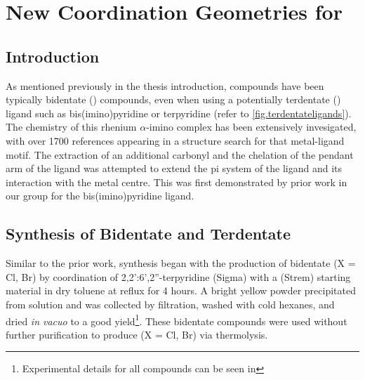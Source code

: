 \chapter{New Coordination Geometries for \texorpdfstring{}{Rhenium (I)}}
\section{Introduction}

As mentioned previously in the thesis introduction,  compounds have been typically bidentate () compounds, even when using a potentially terdentate () ligand such as bis(imino)pyridine or terpyridine (refer to \autoref{fig.terdentateligands}). The chemistry of this rhenium $\alpha$-imino complex has been extensively invesigated, with over 1700 references appearing in a structure search for that metal-ligand motif. The extraction of an additional carbonyl and the chelation of the pendant arm of the ligand was attempted to extend the pi system of the ligand and its interaction with the metal centre. This was first demonstrated by prior work in our group for the bis(imino)pyridine ligand\autocite{jurca2013}. 

\section{Synthesis of Bidentate and Terdentate}

Similar to the prior work, synthesis began with the production of bidentate  (X = Cl, Br) by coordination of 2,2':6',2''-terpyridine (Sigma) with a  (Strem) starting material in dry toluene at reflux for 4 hours. A bright yellow powder precipitated from solution and was collected by filtration, washed with cold hexanes, and dried \textit{in vacuo} to a good yield\footnote{Experimental details for all compounds can be seen in }. These bidentate compounds were used without further purification to produce  (X = Cl, Br) via thermolysis. 

